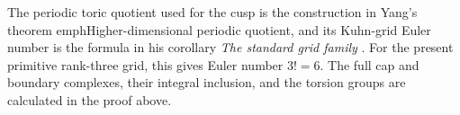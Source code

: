 The periodic toric quotient used for the cusp is the construction in
Yang's theorem emph{Higher-dimensional periodic quotient}, and its
Kuhn-grid Euler number is the formula in his corollary
\emph{The standard grid family}
\cite[section on periodic toroidal quotients in arbitrary dimension]{manYang26}.
For the present primitive rank-three grid, this gives Euler number
$3!=6$.  The full cap and boundary complexes, their integral inclusion,
and the torsion groups are calculated in the proof above.

